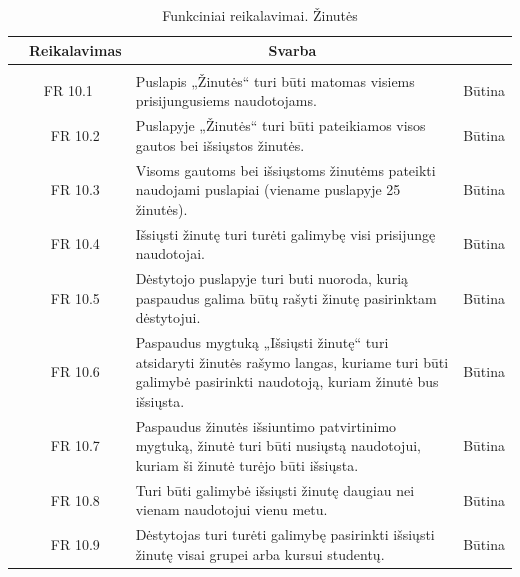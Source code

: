 \documentclass{VUMIFPSkursinis}
\begin{document}
\begin{table}[H]
	\caption{Funkciniai reikalavimai. Žinutės}
	\begin{tabular}{|p{1cm}|p{1cm}|p{}|p{}|}
		\hline 
		\rowcolor{gray!50}
		\multicolumn{2}{|c|}{{\bfseries Kodas}}&
		\multicolumn{1}{c|}{{\bfseries Reikalavimas}}&
		\multicolumn{1}{c|}{{\bfseries Svarba}}\\
		\hline
		\rowcolor{lightgray}
		\multicolumn{4}{|c|}{Žinutės}\\		
		
		\hline
		\multicolumn{2}{|c|}{FR 10.1}&
		{Puslapis „Žinutės“ turi būti matomas visiems prisijungusiems naudotojams.
		}&		
		\multicolumn{1}{c|}{Būtina}\\
		\hline
		\multicolumn{1}{|c}{}&
		\multicolumn{1}{c|}{FR 10.2}&
		{Puslapyje „Žinutės“ turi būti pateikiamos visos gautos bei išsiųstos žinutės.
		}&		
		\multicolumn{1}{c|}{Būtina}\\
		\hline
		\multicolumn{1}{|c}{}&
		\multicolumn{1}{c|}{FR 10.3}&
		{Visoms gautoms bei išsiųstoms žinutėms pateikti naudojami puslapiai (viename puslapyje 25 žinutės).
		}&
		\multicolumn{1}{c|}{Būtina}\\	
		\hline		
		\multicolumn{1}{|c}{}&
		\multicolumn{1}{c|}{FR 10.4}&
		{Išsiųsti žinutę turi turėti galimybę visi prisijungę naudotojai.
		}&
		\multicolumn{1}{c|}{Būtina}\\									
		\hline
		\multicolumn{1}{|c}{}&
		\multicolumn{1}{c|}{FR 10.5}&
		{Dėstytojo puslapyje turi buti nuoroda, kurią paspaudus galima būtų rašyti žinutę pasirinktam dėstytojui.
		}&
		\multicolumn{1}{c|}{Būtina}\\	
		\hline	
		\multicolumn{1}{|c}{}&
		\multicolumn{1}{c|}{FR 10.6}&
		{Paspaudus mygtuką „Išsiųsti žinutę“ turi atsidaryti žinutės rašymo langas, kuriame turi būti galimybė pasirinkti naudotoją, kuriam žinutė bus išsiųsta.
		}&
		\multicolumn{1}{c|}{Būtina}\\	
		\hline		
		\multicolumn{1}{|c}{}&
		\multicolumn{1}{c|}{FR 10.7}&
		{Paspaudus žinutės išsiuntimo patvirtinimo mygtuką, žinutė turi būti nusiųstą naudotojui, kuriam ši žinutė turėjo būti išsiųsta.
		}&
		\multicolumn{1}{c|}{Būtina}\\									
		\hline
		\multicolumn{1}{|c}{}&
		\multicolumn{1}{c|}{FR 10.8}&
		{Turi būti galimybė išsiųsti žinutę daugiau nei vienam naudotojui vienu metu.
		}&
		\multicolumn{1}{c|}{Būtina}\\	
		\hline	
		\multicolumn{1}{|c}{}&
		\multicolumn{1}{c|}{FR 10.9}&
		{Dėstytojas turi turėti galimybę pasirinkti išsiųsti žinutę visai grupei arba kursui studentų.
		}&
		\multicolumn{1}{c|}{Būtina}\\	
		\hline		
	\end{tabular}		
\end{table}
\end{document}
